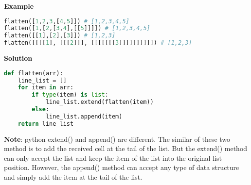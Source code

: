 \documentclass[10pt,letterpaper]{article}
\begin{document}
\begin{itemize}
\textbf{Example}
\begin{lstlisting}[language=Python]
flatten([1,2,3,[4,5]]) # [1,2,3,4,5]
flatten([1,[2,[3,4],[[5]]]]) # [1,2,3,4,5]
flatten([[1],[2],[3]]) # [1,2,3]
flatten([[[[1], [[[2]]], [[[[[[[3]]]]]]]]]]) # [1,2,3]
\end{lstlisting}
\textbf{Solution}
\begin{lstlisting}[language=Python]
def flatten(arr):
    line_list = []
    for item in arr:
        if type(item) is list:
            line_list.extend(flatten(item))
        else:
            line_list.append(item)
    return line_list
\end{lstlisting}
\textbf{Note}: python extend() and append() are different. The similar of these two method is to add the received cell at the tail of the list. But the extend() method can only accept the list and keep the item of the list into the original list position. However, the append() method can accept any type of data structure and simply add the item at the tail of the list.








































\end{itemize}
\end{document}
